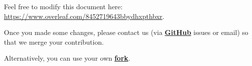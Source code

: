 \documentclass[aspectratio=169]{beamer}
\begin{document}
    \begin{visual}[Welcome]
        \begin{tcolorbox}
        Feel free to modify this document here:\\ \url{https://www.overleaf.com/8452719643bbydhxpthbxr}.
        
        Once you made some changes, please contact us (via \href{https://github.com/UCLOUVAIN-CLUB-ELEC/visual-identity/issues}{\textbf{GitHub}} issues or email) so that we merge your contribution.
        
        Alternatively, you can use your own \href{https://github.com/UCLOUVAIN-CLUB-ELEC/visual-identity}{\textbf{fork}}.
        \end{tcolorbox}
    \end{visual}

    \begin{visual}
    \end{visual}
\end{document}
